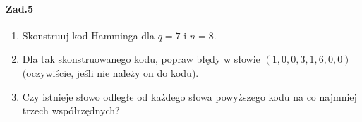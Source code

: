 \paragraph{Zad.5}
\begin{enumerate}[label=\alph*)]
\item Skonstruuj kod Hamminga dla $q = 7$ i $n = 8$.
\item  Dla tak skonstruowanego kodu, popraw błędy w słowie $(1,0,0,3,1,6,0,0)$ (oczywiście, jeśli nie należy on do kodu).
\item Czy istnieje słowo odległe od każdego słowa powyższego kodu na co najmniej trzech współrzędnych?
\end{enumerate}



